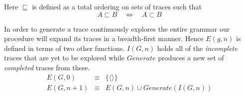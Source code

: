 \documentclass[A4]{sig-alternate}
\begin{document}
Here $\sqsubseteq$ is defined as a total ordering on sets of traces such that
\begin{equation*} A \sqsubset B \quad \iff \quad A \subset B\end{equation*}

In order to generate a trace continuously explores the entire grammar our procedure will expand its traces in a breadth-first manner.
Hence $E(g,n)$ is defined in terms of two other functions. $I(G,n)$ holds all of the \emph{incomplete} traces that are yet to be explored while $Generate$ produces a new set of \emph{completed} traces from these.
\begin{eqnarray*}
E(G, 0)   & \equiv & \{ \langle \rangle \} \\
E(G, n+1) & \equiv & E(G, n) \cup Generate(I(G, n))
\end{eqnarray*}
\end{document}
